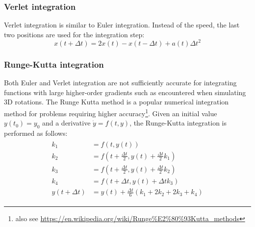\documentclass[10pt,a4paper,twoside]{article}
\begin{document}
\subsubsection{Verlet integration}
Verlet integration is similar to Euler integration. Instead of the speed, the last two positions are used for the integration step:
\begin{equation*}
  x(t + \Delta t) = 2 x(t) - x(t - \Delta t) + a(t) \Delta t^2
\end{equation*}

\subsubsection{Runge-Kutta integration}
Both Euler and Verlet integration are not sufficiently accurate for integrating functions with large higher-order gradients such as encountered when simulating 3D rotations.
The Runge Kutta method is a popular numerical integration method for problems requiring higher accuracy\footnote{also see \url{https://en.wikipedia.org/wiki/Runge\%E2\%80\%93Kutta_methods}}.
Given an initial value $y(t_0)=y_0$ and a derivative $\dot{y}=f(t,y)$, the Runge-Kutta integration is performed as follows:
\begin{align*}
  \begin{split}
    k_1 &= f(t, y(t))\\
    k_2 &= f(t + \frac{\Delta t}{2}, y(t) + \frac{\Delta t}{2} k_1)\\
    k_3 &= f(t + \frac{\Delta t}{2}, y(t) + \frac{\Delta t}{2} k_2)\\
    k_4 &= f(t + \Delta t, y(t) + \Delta t k_3)\\
    y(t + \Delta t) &= y(t) + \frac{\Delta t}{6} (k_1 + 2 k_2 + 2 k_3 + k_4)
  \end{split}
\end{align*}



\end{document}
